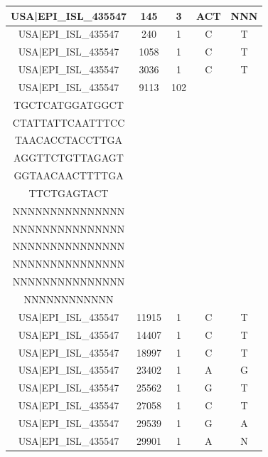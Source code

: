 \documentclass[a4paper,10pt]{article}
\begin{document}
\begin{longtable}{@{}ccccc@{}}
USA|EPI\_ISL\_435547 & 145 & 3 & ACT & NNN \\* \midrule
USA|EPI\_ISL\_435547 & 240 & 1 & C & T \\* \midrule
USA|EPI\_ISL\_435547 & 1058 & 1 & C & T \\* \midrule
USA|EPI\_ISL\_435547 & 3036 & 1 & C & T \\* \midrule
USA|EPI\_ISL\_435547 & 9113 & 102 & \begin{tabular}[c]{@{}c@{}}CTGACACACGTTATG\\ TGCTCATGGATGGCT\\ CTATTATTCAATTTCC\\ TAACACCTACCTTGA\\ AGGTTCTGTTAGAGT\\ GGTAACAACTTTTGA\\ TTCTGAGTACT\end{tabular} & \begin{tabular}[c]{@{}c@{}}NNNNNNNNNNNNNNN\\ NNNNNNNNNNNNNNN\\ NNNNNNNNNNNNNNN\\ NNNNNNNNNNNNNNN\\ NNNNNNNNNNNNNNN\\ NNNNNNNNNNNNNNN\\ NNNNNNNNNNNN\end{tabular} \\* \midrule
USA|EPI\_ISL\_435547 & 11915 & 1 & C & T \\* \midrule
USA|EPI\_ISL\_435547 & 14407 & 1 & C & T \\* \midrule
USA|EPI\_ISL\_435547 & 18997 & 1 & C & T \\* \midrule
USA|EPI\_ISL\_435547 & 23402 & 1 & A & G \\* \midrule
USA|EPI\_ISL\_435547 & 25562 & 1 & G & T \\* \midrule
USA|EPI\_ISL\_435547 & 27058 & 1 & C & T \\* \midrule
USA|EPI\_ISL\_435547 & 29539 & 1 & G & A \\* \midrule
USA|EPI\_ISL\_435547 & 29901 & 1 & A & N \\* \bottomrule
\end{longtable}

\restoregeometry
\end{document}
